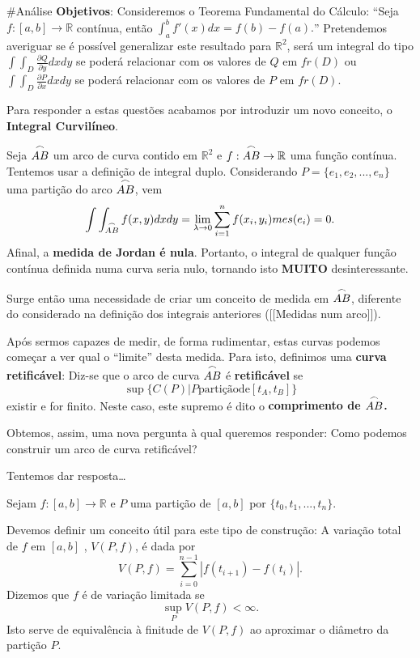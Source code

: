 \documentclass[
]{article}
\author{}
\date{}
\begin{document}
\#Análise \textbf{Objetivos}: Consideremos o Teorema Fundamental do
Cálculo: ``Seja \(f:[a,b]\rightarrow\mathbb{R}\) contínua, então
\(\int_a^bf'(x)dx = f(b)-f(a).\)'' Pretendemos averiguar se é possível
generalizar este resultado para \(\mathbb{R}^2\), será um integral do
tipo \(\int\int_D\frac{\partial Q}{\partial y}dxdy\) se poderá
relacionar com os valores de \(Q\) em \(fr(D)\) ou
\(\int\int_D\frac{\partial P}{\partial x}dxdy\) se poderá relacionar com
os valores de \(P\) em \(fr(D)\).

Para responder a estas questões acabamos por introduzir um novo
conceito, o \textbf{Integral Curvilíneo}.

Seja \(\overset{\LARGE \frown}{\small{AB}}\) um arco de curva contido em
\(\mathbb{R}^2\) e
\(f:\overset{\LARGE \frown}{\small{AB}} \rightarrow\mathbb{R}\) uma
função contínua. Tentemos usar a definição de integral duplo.
Considerando \(P=\{e_1,e_2,...,e_n\}\) uma partição do arco
\(\overset{\LARGE \frown}{\small{AB}}\), vem \[
 \int\int_{\overset{\LARGE \frown}{\small{AB}}}f(x,y)dxdy=\lim_{\lambda\rightarrow0}\sum^n_{i=1}f(x_i,y_i)mes(e_i)=0.
 \] Afinal, a \textbf{medida de Jordan é nula}. Portanto, o integral de
qualquer função contínua definida numa curva seria nulo, tornando isto
\textbf{MUITO} desinteressante.

Surge então uma necessidade de criar um conceito de medida em
\(\overset{\LARGE \frown}{\small{AB}}\), diferente do considerado na
definição dos integrais anteriores ({[}{[}Medidas num arco{]}{]}).

Após sermos capazes de medir, de forma rudimentar, estas curvas podemos
começar a ver qual o ``limite'' desta medida. Para isto, definimos uma
\textbf{curva retificável}: Diz-se que o arco de curva
\(\overset{\LARGE \frown}{\small{AB}}\) é \textbf{retificável} se \[
        \sup\{C(P)| P\mathrm{ partição de }[t_A,t_B]\}
        \] existir e for finito. Neste caso, este supremo é dito o
\textbf{comprimento de \(\overset{\LARGE \frown}{\small{AB}}\).}

Obtemos, assim, uma nova pergunta à qual queremos responder: Como
podemos construir um arco de curva retificável?

Tentemos dar resposta\ldots{}

Sejam \(f:[a,b]\rightarrow\mathbb{R}\) e \(P\) uma partição de \([a,b]\)
por \(\{t_0,t_1,...,t_n\}\).

Devemos definir um conceito útil para este tipo de construção: A
variação total de \(f\) em \([a,b]\) , \(V(P,f)\), é dada
por\[V(P,f)=\sum^{n-1}_{i=0}|f(t_{i+1})-f(t_i)|.\] Dizemos que \(f\) é
de variação limitada se \[\sup_P V(P,f)<\infty.\] Isto serve de
equivalência à finitude de \(V(P,f)\) ao aproximar o diâmetro da
partição \(P\).
\end{document}
